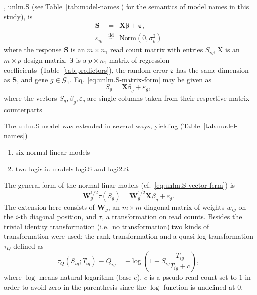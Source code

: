 \documentclass[12pt,letterpaper]{article}
\begin{document}
, unlm.S (see Table~\ref{tab:model-names}) for the semantics of
model names in this study), is
\begin{eqnarray}
\mathbf{S} &=& \mathbf{X} \boldsymbol{\beta} + \boldsymbol{\varepsilon},
\label{eq:unlm.S-matrix-form} \\
\varepsilon_{ig} &\overset{\mathrm{iid}}{\sim}& \mathrm{Norm}(0, \sigma^2_g)
\end{eqnarray}
where the response \(\mathbf{S}\) is an \(m\times n_1\) read count matrix with
entries \(S_{ig}\), \(\mathrm{X}\) is an \(m\times p\) design matrix,
\(\boldsymbol{\beta}\) is a \(p\times n_1\) matrix of regression
coefficients~(Table~\ref{tab:predictors}), the random error
\(\boldsymbol{\varepsilon}\) has the same dimension as \(\mathbf{S}\), and
gene \(g\in \mathcal{G}_1\).  Eq.~\ref{eq:unlm.S-matrix-form} may be given as
\begin{equation}
S_g = \mathbf{X} \beta_g + \varepsilon_g,
\label{eq:unlm.S-vector-form}
\end{equation}
where the vectors \(S_g, \beta_g, \varepsilon_g\)
are single columns taken from their respective matrix counterparts.

The unlm.S model was extended in several ways, yielding (Table~\ref{tab:model-names})
\begin{enumerate}
\item six normal linear models
\item two logistic models logi.S and logi2.S.
\end{enumerate}

The general form of the normal linar models
(cf.~\ref{eq:unlm.S-vector-form}) is
\begin{equation}
\mathbf{W}_g^{1/2} \tau(S_g) = \mathbf{W}_g^{1/2} \mathbf{X} \beta_g + \varepsilon_g.
\label{eq:nlm-general}
\end{equation}
The extension here consists of \(\mathbf{W}_g\), an \(m\times m\) diagonal matrix of
weights \(w_{ig}\) on the \(i\)-th diagonal position, and \(\tau\), a
transformation on read counts.  Besides the trivial identity transformation
(i.e.~no transformation) two kinds of transformation were used: the rank
transformation and a quasi-log transformation \(\tau_Q\) defined as
\begin{equation}
\tau_Q(S_{ig};T_{ig}) \equiv Q_{ig} = - \log \left( 1 - S_{ig} \frac{T_{ig}}{T_{ig} + c}
\right),
\label{eq:Q}
\end{equation}
where \(\log\) means natural logarithm (base \(e\)).  \(c\) is a pseudo read
count set to \(1\) in order to avoid zero in the parenthesis since the \(\log\)
function is undefined at \(0\).
\end{document}
